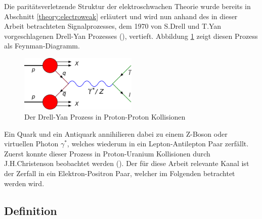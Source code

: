 Die paritätsverletzende Struktur der elektroschwachen Theorie wurde bereits in
Abschnitt \ref{theory:electroweak} erläutert und wird nun anhand des in dieser
Arbeit betrachteten Signalprozesses, dem 1970 von S.Drell und T.Yan
vorgeschlagenen Drell-Yan Prozesses (\cite{PhysRevLett.25.316}), vertieft.
Abbildung \ref{fig:drell_yan} zeigt diesen Prozess als Feynman-Diagramm.
\begin{figure}[h]
    \centering
    \includegraphics[width=0.5\textwidth]{img/drell_yan}
    \caption{Der Drell-Yan Prozess in Proton-Proton Kollisionen}
    \label{fig:drell_yan}
\end{figure}
Ein Quark und ein Antiquark annihilieren dabei zu einem Z-Boson oder virtuellen
Photon $\gamma^*$, welches wiederum in ein Lepton-Antilepton Paar zerfällt.
Zuerst konnte dieser Prozess in Proton-Uranium Kollisionen durch
J.H.Christenson beobachtet werden (\cite{PhysRevLett.25.1523}). Der für diese
Arbeit relevante Kanal ist der Zerfall in ein Elektron-Positron Paar, welcher
im Folgenden betrachtet werden wird.



\subsection{Definition}
\label{theory:afb_definition}

